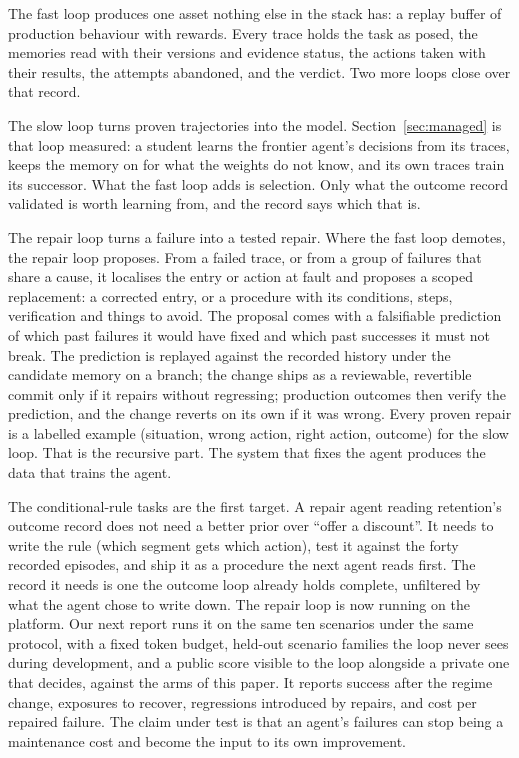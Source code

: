 \documentclass[11pt]{article}
\begin{document}
The fast loop produces one asset nothing else in the stack has: a replay buffer of production
behaviour with rewards. Every trace holds the task as posed, the memories read with their
versions and evidence status, the actions taken with their results, the attempts abandoned,
and the verdict. Two more loops close over that record.

The slow loop turns proven trajectories into the model. Section~\ref{sec:managed} is that loop
measured: a student learns the frontier agent's decisions from its traces, keeps the memory on
for what the weights do not know, and its own traces train its successor. What the fast loop
adds is selection. Only what the outcome record validated is worth learning from, and the
record says which that is.

The repair loop turns a failure into a tested repair. Where the fast loop demotes, the repair
loop proposes. From a failed trace, or from a group of failures that share a cause, it
localises the entry or action at fault and proposes a scoped replacement: a corrected entry,
or a procedure with its conditions, steps, verification and things to avoid. The proposal
comes with a falsifiable prediction of which past failures it would have fixed and which past
successes it must not break. The prediction is replayed against the recorded history under the
candidate memory on a branch; the change ships as a reviewable, revertible commit only if it
repairs without regressing; production outcomes then verify the prediction, and the change
reverts on its own if it was wrong. Every proven repair is a labelled example (situation, wrong
action, right action, outcome) for the slow loop. That is the recursive part. The system that
fixes the agent produces the data that trains the agent.

The conditional-rule tasks are the first target. A repair agent reading retention's outcome
record does not need a better prior over ``offer a discount''. It needs to write the rule
(which segment gets which action), test it against the forty recorded episodes, and ship it as
a procedure the next agent reads first. The record it needs is one the outcome loop already
holds complete, unfiltered by what the agent chose to write down. The repair loop is now
running on the platform. Our next report runs it on the same ten scenarios under the same
protocol, with a fixed token budget, held-out scenario families the loop never sees during
development, and a public score visible to the loop alongside a private one that decides,
against the arms of this paper. It reports success after the regime change, exposures to
recover, regressions introduced by repairs, and cost per repaired failure. The claim under test
is that an agent's failures can stop being a maintenance cost and become the input to its own
improvement.
\end{document}
